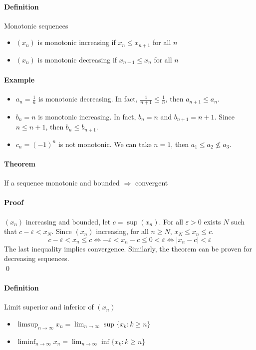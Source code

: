 \documentclass{article}
\newcommand{\abs}[1]{\left|#1\right|}
\newcommand{\limn}{\lim_{n \to \infty}}
\newcommand{\Ep}{\varepsilon}
\newcommand{\Def}{\paragraph{Definition}}
\newcommand{\Theorem}{\paragraph{Theorem}}
\newcommand{\Proof}{\paragraph{Proof}}
\newcommand{\Example}{\paragraph{Example}}
\begin{document}
  \Def Monotonic sequences
  \begin{itemize}
    \item $(x_n)$ is monotonic increasing if $x_n \leq x_{n+1}$ for all $n$
    \item $(x_n)$ is monotonic decreasing if $x_{n+1} \leq x_n$ for all $n$
  \end{itemize}

  \Example
  \begin{itemize}
    \item $a_n = \frac{1}{n}$ is monotonic decreasing. In fact, $\frac{1}{n+1}
    \leq \frac{1}{n}$, then $a_{n+1} \leq a_n$.
    \item $b_n = n$ is monotonic increasing. In fact, $b_n = n$ and $b_{n+1} =
    n + 1$. Since $n \leq n + 1$, then $b_n \leq b_{n+1}$.
    \item $c_n = (-1)^n$ is not monotonic. We can take $n = 1$, then $a_1 \leq
    a_2 \nleq a_3$.
  \end{itemize}

  \Theorem If a sequence monotonic and bounded $\Rightarrow$ convergent

  \Proof $(x_n)$ increasing and bounded, let $c = \sup(x_n)$. For all $\Ep
  > 0$ exists $N$ such that $c - \Ep < x_N$. Since $(x_n)$ increasing, for
  all $n \geq N$, $x_N \leq x_n \leq c$.
  \begin{equation*}
    c - \Ep < x_n \leq c \iff -\Ep < x_n - c \leq 0 < \Ep \iff
    \abs{x_n - c} < \Ep
  \end{equation*}
  The last inequality implies convergence. Similarly, the theorem can be proven
  for decreasing sequences.
\\\qed

  \Def Limit superior and inferior of $(x_n)$
  \begin{itemize}
    \item $\limsup_{n \to \infty} x_n = \limn \sup\{x_k : k \geq n\}$
    \item $\liminf_{n \to \infty} x_n = \limn \inf\{x_k : k \geq n\}$
  \end{itemize}
\end{document}
